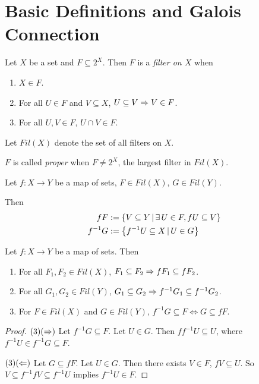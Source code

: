\documentclass[main.tex]{subfiles}
\begin{document}
\section{Basic Definitions and Galois Connection}

\begin{dfn}[Filter] 

  Let $X$ be a set and $F \subseteq 2^X$. 
  Then $F$ is a \emph{filter on $X$} when 
  \begin{enumerate}
    \item $X \in F$. 
    \item For all $U \in F$ and $V \subseteq X$, 
    $U \subseteq V \Rightarrow V \in F$.  
    \item For all $U, V \in F$, $U \cap V \in F$. 
  \end{enumerate} 
  Let $Fil(X)$ denote the set of all filters on $X$.

  $F$ is called \emph{proper} when $F \neq 2^X$,
  the largest filter in $Fil(X)$. 
\end{dfn} 

\begin{dfn}

  Let $f : X \to Y$ be a map of sets, $F \in Fil(X)$, $G \in Fil(Y)$. 
  
  Then \begin{align*}
    f F &:= \left\{V \subseteq Y \,|\, \exists\,U \in F, f U \subseteq V\right\} \\
    f^{-1} G &:= \left\{f^{-1}U \subseteq X \,|\, U \in G\right\}
  \end{align*}
\end{dfn}

\begin{thm}

  Let $f : X \to Y$ be a map of sets. 
  Then \begin{enumerate}
    \item For all $F_1, F_2 \in Fil(X)$, 
    $F_1 \subseteq F_2 \Rightarrow fF_1 \subseteq fF_2$.
    \item For all $G_1, G_2 \in Fil(Y)$,
    $G_1 \subseteq G_2 \Rightarrow f^{-1}G_1 \subseteq f^{-1}G_2$. 
    \item For $F \in Fil(X)$ and $G \in Fil(Y)$, 
    $f^{-1}G \subseteq F \iff G \subseteq fF$.
  \end{enumerate}
\end{thm}
\begin{proof} 
  $(3)(\Rightarrow)$ Let $f^{-1}G \subseteq F$. Let $U \in G$. 
  Then $f f^{-1} U \subseteq U$, where $f^{-1}U \in f^{-1}G \subseteq F$. 

  $(3)(\Leftarrow)$ Let $G \subseteq fF$. Let $U \in G$.
  Then there exists $V \in F$, $fV \subseteq U$.
  So $V \subseteq f^{-1} fV \subseteq f^{-1}U$ implies $f^{-1}U \in F$.
\end{proof}
\end{document}

